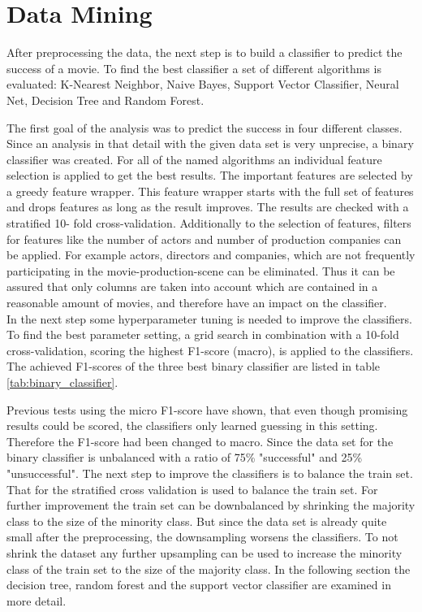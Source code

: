 \chapter{Data Mining}
\label{cha:data_mining}

After preprocessing the data, the next step is to build a classifier to predict the success of a movie. To find the best classifier a set of different algorithms is evaluated:
K-Nearest Neighbor, 
Naive Bayes, 
Support Vector Classifier, 
Neural Net, 
Decision Tree and 
Random Forest.

The first goal of the analysis was to predict the success in four different classes. Since an analysis in that detail with the given data set is very unprecise, a binary classifier was created.
For all of the named algorithms an individual feature selection is applied to get the best results. The important features are selected by a greedy feature wrapper. This feature wrapper starts with the full set of features and drops features as long as the result improves. The results are checked with a stratified 10- fold cross-validation. Additionally to the selection of features, filters for features like the number of actors and number of production companies can be applied. For example actors, directors and companies, which are not frequently participating in the movie-production-scene can be eliminated. Thus it can be assured that only columns are taken into account which are contained in a reasonable amount of movies, and therefore have an impact on the classifier. \\
In the next step some hyperparameter tuning is needed to improve the classifiers. To find the best parameter setting, a grid search in combination with a 10-fold cross-validation, scoring the highest F1-score (macro), is applied to the classifiers.
The achieved F1-scores of the three best binary classifier are listed in table \ref{tab:binary_classifier}. 

Previous tests using the micro F1-score have shown, that even though promising results could be scored, the classifiers only learned guessing in this setting. Therefore the F1-score had been changed to macro.
 Since the data set for the binary classifier is unbalanced with a ratio of 75\% "successful" and 25\% "unsuccessful". The next step to improve the classifiers is to balance the train set. That for the stratified cross validation is used to balance the train set. For further improvement the train set can be downbalanced by shrinking the majority class to the size of the minority class. But since the data set is already quite small after the preprocessing, the downsampling worsens the classifiers. To not shrink the dataset any further upsampling can be used to increase the minority class of the train set to the size of the majority class. In the following section the decision tree, random forest and the support vector classifier are examined in more detail.


